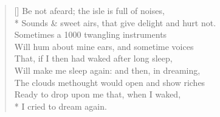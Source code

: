 \documentclass[MAIN]{subfiles}
\begin{document}
\settowidth{\versewidth}{Be not afeard; the isle is full of noises,}
\begin{verse}[\versewidth]
Be not afeard; the isle is full of noises,\\*
Sounds \& sweet airs, that give delight and hurt not.\\
Sometimes a 1000 twangling instruments\\
Will hum about mine ears, and sometime voices\\
That, if I then had waked after long sleep,\\
Will make me sleep again: and then, in dreaming,\\
The clouds methought would open and show riches\\
Ready to drop upon me that, when I waked,\\*
I cried to dream again.
\end{verse}
\end{document}
